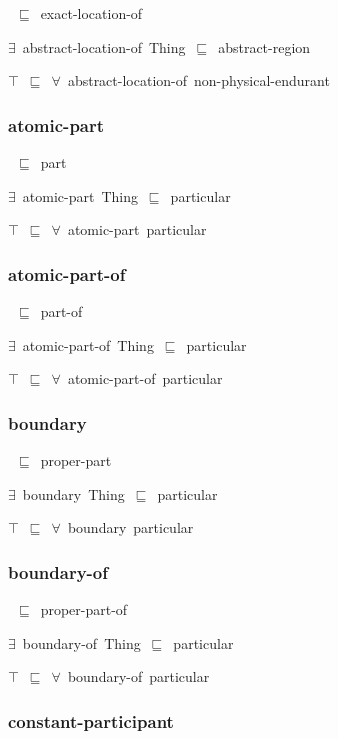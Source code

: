 \documentclass{article}
\begin{document}
~\ensuremath{\sqsubseteq}~exact-location-of

\ensuremath{\exists}~abstract-location-of~Thing~\ensuremath{\sqsubseteq}~abstract-region

\ensuremath{\top}~\ensuremath{\sqsubseteq}~\ensuremath{\forall}~abstract-location-of~non-physical-endurant

\subsubsection*{atomic-part}

~\ensuremath{\sqsubseteq}~part

\ensuremath{\exists}~atomic-part~Thing~\ensuremath{\sqsubseteq}~particular

\ensuremath{\top}~\ensuremath{\sqsubseteq}~\ensuremath{\forall}~atomic-part~particular

\subsubsection*{atomic-part-of}

~\ensuremath{\sqsubseteq}~part-of

\ensuremath{\exists}~atomic-part-of~Thing~\ensuremath{\sqsubseteq}~particular

\ensuremath{\top}~\ensuremath{\sqsubseteq}~\ensuremath{\forall}~atomic-part-of~particular

\subsubsection*{boundary}

~\ensuremath{\sqsubseteq}~proper-part

\ensuremath{\exists}~boundary~Thing~\ensuremath{\sqsubseteq}~particular

\ensuremath{\top}~\ensuremath{\sqsubseteq}~\ensuremath{\forall}~boundary~particular

\subsubsection*{boundary-of}

~\ensuremath{\sqsubseteq}~proper-part-of

\ensuremath{\exists}~boundary-of~Thing~\ensuremath{\sqsubseteq}~particular

\ensuremath{\top}~\ensuremath{\sqsubseteq}~\ensuremath{\forall}~boundary-of~particular

\subsubsection*{constant-participant}
\end{document}
